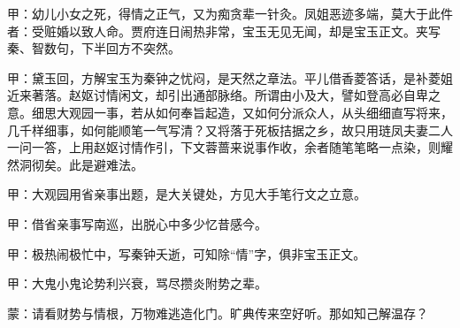 
\begin{parag}
    \begin{note}甲：幼儿小女之死，得情之正气，又为痴贪辈一针灸。凤姐恶迹多端，莫大于此件者：受赃婚以致人命。贾府连日闹热非常，宝玉无见无闻，却是宝玉正文。夹写秦、智数句，下半回方不突然。\end{note}
\end{parag}


\begin{parag}
    \begin{note}甲：黛玉回，方解宝玉为秦钟之忧闷，是天然之章法。平儿借香菱答话，是补菱姐近来著落。赵妪讨情闲文，却引出通部脉络。所谓由小及大，譬如登高必自卑之意。细思大观园一事，若从如何奉旨起造，又如何分派众人，从头细细直写将来，几千样细事，如何能顺笔一气写清？又将落于死板拮据之乡，故只用琏凤夫妻二人一问一答，上用赵妪讨情作引，下文蓉蔷来说事作收，余者随笔笔略一点染，则耀然洞彻矣。此是避难法。\end{note}
\end{parag}


\begin{parag}
    \begin{note}甲：大观园用省亲事出题，是大关键处，方见大手笔行文之立意。\end{note}
\end{parag}


\begin{parag}
    \begin{note}甲：借省亲事写南巡，出脱心中多少忆昔感今。\end{note}
\end{parag}


\begin{parag}
    \begin{note}甲：极热闹极忙中，写秦钟夭逝，可知除“情”字，俱非宝玉正文。\end{note}
\end{parag}


\begin{parag}
    \begin{note}甲：大鬼小鬼论势利兴衰，骂尽攒炎附势之辈。\end{note}
\end{parag}


\begin{parag}
    \begin{note}蒙：请看财势与情根，万物难逃造化门。旷典传来空好听。那如知己解温存？\end{note}
\end{parag}


